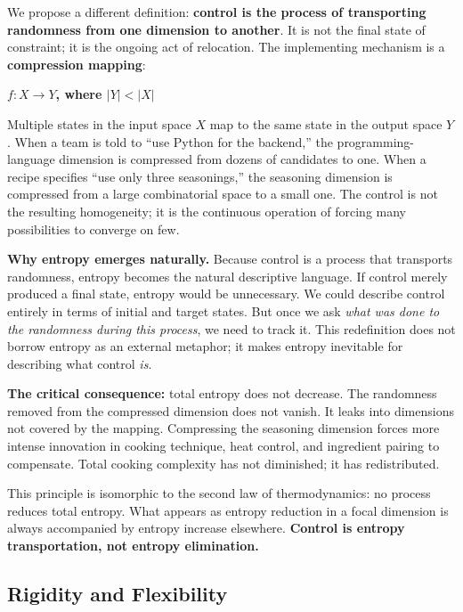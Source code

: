 \documentclass[11pt,a4paper]{article}
\begin{document}
We propose a different definition: \textbf{control is the process of transporting randomness from one dimension to another}. It is not the final state of constraint; it is the ongoing act of relocation. The implementing mechanism is a \textbf{compression mapping}:

\begin{center}
\textbf{$f: X \rightarrow Y$, where $|Y| < |X|$}
\end{center}

Multiple states in the input space $X$ map to the same state in the output space $Y$. When a team is told to ``use Python for the backend,'' the programming-language dimension is compressed from dozens of candidates to one. When a recipe specifies ``use only three seasonings,'' the seasoning dimension is compressed from a large combinatorial space to a small one. The control is not the resulting homogeneity; it is the continuous operation of forcing many possibilities to converge on few.

\textbf{Why entropy emerges naturally.} Because control is a process that transports randomness, entropy becomes the natural descriptive language. If control merely produced a final state, entropy would be unnecessary. We could describe control entirely in terms of initial and target states. But once we ask \textit{what was done to the randomness during this process}, we need to track it. This redefinition does not borrow entropy as an external metaphor; it makes entropy inevitable for describing what control \textit{is}.

\textbf{The critical consequence:} total entropy does not decrease. The randomness removed from the compressed dimension does not vanish. It leaks into dimensions not covered by the mapping. Compressing the seasoning dimension forces more intense innovation in cooking technique, heat control, and ingredient pairing to compensate. Total cooking complexity has not diminished; it has redistributed.

This principle is isomorphic to the second law of thermodynamics: no process reduces total entropy. What appears as entropy reduction in a focal dimension is always accompanied by entropy increase elsewhere. \textbf{Control is entropy transportation, not entropy elimination.}

\subsection{Rigidity and Flexibility}
\end{document}
